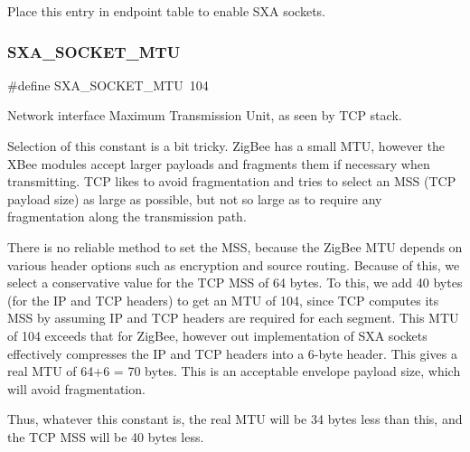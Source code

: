 Place this entry in endpoint table to enable S\+XA sockets. 

\mbox{\label{group___s_x_a_ga24cd1c18c4568b532a09c4d3ae6a3700}} 
\subsubsection{\texorpdfstring{S\+X\+A\+\_\+\+S\+O\+C\+K\+E\+T\+\_\+\+M\+TU}{SXA\_SOCKET\_MTU}}
{\footnotesize\ttfamily \#define S\+X\+A\+\_\+\+S\+O\+C\+K\+E\+T\+\_\+\+M\+TU~104}



Network interface Maximum Transmission Unit, as seen by T\+CP stack. 

Selection of this constant is a bit tricky. Zig\+Bee has a small M\+TU, however the X\+Bee modules accept larger payloads and fragments them if necessary when transmitting. T\+CP likes to avoid fragmentation and tries to select an M\+SS (T\+CP payload size) as large as possible, but not so large as to require any fragmentation along the transmission path.

There is no reliable method to set the M\+SS, because the Zig\+Bee M\+TU depends on various header options such as encryption and source routing. Because of this, we select a conservative value for the T\+CP M\+SS of 64 bytes. To this, we add 40 bytes (for the IP and T\+CP headers) to get an M\+TU of 104, since T\+CP computes its M\+SS by assuming IP and T\+CP headers are required for each segment. This M\+TU of 104 exceeds that for Zig\+Bee, however out implementation of S\+XA sockets effectively compresses the IP and T\+CP headers into a 6-\/byte header. This gives a real M\+TU of 64+6 = 70 bytes. This is an acceptable envelope payload size, which will avoid fragmentation.

Thus, whatever this constant is, the real M\+TU will be 34 bytes less than this, and the T\+CP M\+SS will be 40 bytes less. \mbox{\label{group___s_x_a_ga686d56084362bb9152a4d5e6b048b80d}} 
